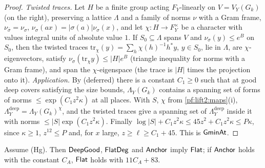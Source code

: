 \begin{proof}
\emph{Twisted traces.} Let $H$ be a finite group acting $F_Y$-linearly on $V=V_Y(G_k)$ (on the right), preserving a
lattice $\Lambda$ and a family of norms $\nu$ with a Gram frame, $\nu_{\bar\sigma}=\nu_\sigma$,
$\nu_\sigma(ax)=|\sigma(a)|\nu_\sigma(x)$, and let $\chi\colon H\to F_Y^\times$ be a character with values integral units of
absolute value $1$. If $S_0\subseteq\Lambda$ spans $V$ and $\nu_\sigma(y)\le e^B$ on $S_0$, then the twisted traces
$\mathrm{tr}_\chi(y)=\sum_h\chi(h)^{-1}h^*y$, $y\in S_0$, lie in $\Lambda$, are $\chi$-eigenvectors, satisfy
$\nu_\sigma(\mathrm{tr}_\chi y)\le|H|e^B$ (triangle inequality for norms with a Gram frame), and span the
$\chi$-eigenspace (the trace is $|H|$ times the projection onto it). \emph{Application.} By
 (deferred) there is a constant $C_1\ge0$ such that at
good deep covers satisfying the size bounds, $\Lambda_Y(G_k)$ contains a spanning set of forms of norms
$\le\exp(C_1z^2\kappa)$ at all places. With $S$, $\chi$ from \cref{pf:lift2:maps}(i), $\Lambda^{\mathrm{deep}}_Y=\Lambda_Y(G_k)^\chi$,
and the twisted traces give a spanning set of $\Lambda^{\mathrm{deep}}_Y$ inside it with norms $\le|S|\exp(C_1z^2\kappa)$.
Finally $\log|S|+C_1z^2\kappa\le45z^2+C_1z^2\kappa\le P\kappa$, since $\kappa\ge1$, $z^{12}\le P$ and, for $x$ large,
$z\ge\ell\ge C_1+45$. This is $\mathsf{GminAt}$.
\end{proof}

\begin{proposition}[Flatness]\label{pf:lift2:flat}
Assume \textup{(Hg)}. Then $\mathsf{DeepGood}$, $\mathsf{FlatDeg}$ and $\mathsf{Anchor}$ imply $\mathsf{Flat}$; if
$\mathsf{Anchor}$ holds with the constant $C_A$, $\mathsf{Flat}$ holds with $11C_A+83$.
\end{proposition}

